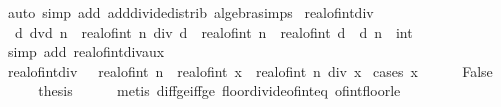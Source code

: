 \begin{isabellebody}
\ {\isacharparenleft}{\kern0pt}auto\ simp\ add{\isacharcolon}{\kern0pt}\ add{\isacharunderscore}{\kern0pt}divide{\isacharunderscore}{\kern0pt}distrib\ algebra{\isacharunderscore}{\kern0pt}simps{\isacharparenright}{\kern0pt}\isanewline
{}\isamarkupfalse%
%
\endisatagproof
{\isafoldproof}%
%
\isadelimproof
\isanewline
%
\endisadelimproof
\isanewline
{}\isamarkupfalse%
\ real{\isacharunderscore}{\kern0pt}of{\isacharunderscore}{\kern0pt}int{\isacharunderscore}{\kern0pt}div{\isacharcolon}{\kern0pt}\isanewline
\ \ {\isachardoublequoteopen}d\ dvd\ n\ {\isasymLongrightarrow}\ real{\isacharunderscore}{\kern0pt}of{\isacharunderscore}{\kern0pt}int\ {\isacharparenleft}{\kern0pt}n\ div\ d{\isacharparenright}{\kern0pt}\ {\isacharequal}{\kern0pt}\ real{\isacharunderscore}{\kern0pt}of{\isacharunderscore}{\kern0pt}int\ n\ {\isacharslash}{\kern0pt}\ real{\isacharunderscore}{\kern0pt}of{\isacharunderscore}{\kern0pt}int\ d{\isachardoublequoteclose}\ \ d\ n\ {\isacharcolon}{\kern0pt}{\isacharcolon}{\kern0pt}\ int\isanewline
%
\isadelimproof
\ \ %
\endisadelimproof
%
\isatagproof
{}\isamarkupfalse%
\ {\isacharparenleft}{\kern0pt}simp\ add{\isacharcolon}{\kern0pt}\ real{\isacharunderscore}{\kern0pt}of{\isacharunderscore}{\kern0pt}int{\isacharunderscore}{\kern0pt}div{\isacharunderscore}{\kern0pt}aux{\isacharparenright}{\kern0pt}%
\endisatagproof
{\isafoldproof}%
%
\isadelimproof
\isanewline
%
\endisadelimproof
\isanewline
{}\isamarkupfalse%
\ real{\isacharunderscore}{\kern0pt}of{\isacharunderscore}{\kern0pt}int{\isacharunderscore}{\kern0pt}div{}{\isacharcolon}{\kern0pt}\ {\isachardoublequoteopen}{}\ {\isasymle}\ real{\isacharunderscore}{\kern0pt}of{\isacharunderscore}{\kern0pt}int\ n\ {\isacharslash}{\kern0pt}\ real{\isacharunderscore}{\kern0pt}of{\isacharunderscore}{\kern0pt}int\ x\ {\isacharminus}{\kern0pt}\ real{\isacharunderscore}{\kern0pt}of{\isacharunderscore}{\kern0pt}int\ {\isacharparenleft}{\kern0pt}n\ div\ x{\isacharparenright}{\kern0pt}{\isachardoublequoteclose}\isanewline
%
\isadelimproof
%
\endisadelimproof
%
\isatagproof
{}\isamarkupfalse%
\ {\isacharparenleft}{\kern0pt}cases\ {\isachardoublequoteopen}x\ {\isacharequal}{\kern0pt}\ {}{\isachardoublequoteclose}{\isacharparenright}{\kern0pt}\isanewline
\ \ \isamarkupfalse%
\ False\isanewline
\ \ \isamarkupfalse%
\ \isamarkupfalse%
\ {\isacharquery}{\kern0pt}thesis\isanewline
\ \ \ \ \isamarkupfalse%
\ {\isacharparenleft}{\kern0pt}metis\ diff{\isacharunderscore}{\kern0pt}ge{\isacharunderscore}{\kern0pt}{}{\isacharunderscore}{\kern0pt}iff{\isacharunderscore}{\kern0pt}ge\ floor{\isacharunderscore}{\kern0pt}divide{\isacharunderscore}{\kern0pt}of{\isacharunderscore}{\kern0pt}int{\isacharunderscore}{\kern0pt}eq\ of{\isacharunderscore}{\kern0pt}int{\isacharunderscore}{\kern0pt}floor{\isacharunderscore}{\kern0pt}le{\isacharparenright}{\kern0pt}\isanewline

\end{isabellebody}
